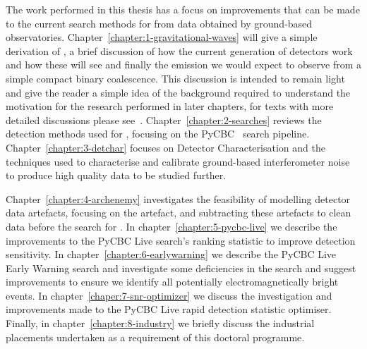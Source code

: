 The work performed in this thesis has a focus on improvements that can be made to the current search methods for \gws from data obtained by ground-based \gwadj observatories. Chapter~\ref{chapter:1-gravitational-waves} will give a simple derivation of \gws, a brief discussion of how the current generation of detectors work and how these will see \gws and finally the \gwadj emission we would expect to observe from a simple compact binary coalescence. This discussion is intended to remain light and give the reader a simple idea of the background required to understand the motivation for the research performed in later chapters, for texts with more detailed discussions please see~\cite{Moore_book:2012, Maggiore_book:2007, Schutz_book:2009}. Chapter~\ref{chapter:2-searches} reviews the detection methods used for \gws, focusing on the PyCBC~\cite{PyCBC:2016} search pipeline. Chapter~\ref{chapter:3-detchar} focuses on Detector Characterisation and the techniques used to characterise and calibrate ground-based interferometer noise to produce high quality data to be studied further.

Chapter~\ref{chapter:4-archenemy} investigates the feasibility of modelling \gwadj detector data artefacts, focusing on the \scladj artefact, and subtracting these artefacts to clean data before the search for \gws. In chapter~\ref{chapter:5-pycbc-live} we describe the improvements to the PyCBC Live search's ranking statistic to improve detection sensitivity. In chapter~\ref{chapter:6-earlywarning} we describe the PyCBC Live Early Warning search and investigate some deficiencies in the search and suggest improvements to ensure we identify all potentially electromagnetically bright events. In chapter~\ref{chaper:7-snr-optimizer} we discuss the investigation and improvements made to the PyCBC Live rapid detection statistic optimiser. Finally, in chapter~\ref{chapter:8-industry} we briefly discuss the industrial placements undertaken as a requirement of this doctoral programme.
